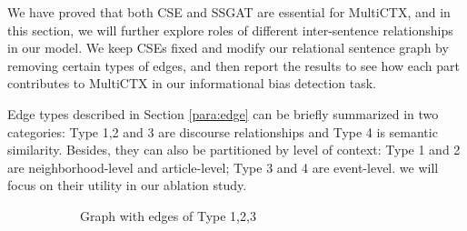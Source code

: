 \documentclass[letterpaper]{article} %
\begin{document}
We have proved that both CSE and SSGAT are essential for MultiCTX, and in this section, we will further explore roles of different inter-sentence relationships in our model. We keep CSEs fixed and modify our relational sentence graph by removing certain types of edges, and then report the results to see how each part contributes to MultiCTX in our informational bias detection task.

Edge types described in Section \ref{para:edge} can be briefly summarized in two categories: Type 1,2 and 3 are discourse relationships and Type 4 is semantic similarity. Besides, they can also be partitioned by level of context: Type 1 and 2 are neighborhood-level and article-level; Type 3 and 4 are event-level. we will focus on their utility in our ablation study. 

\begin{figure}[!htbp]\centering
  \begin{subfigure}[t]{.15\linewidth}
    \caption{\scriptsize Graph with edges of Type 1,2,3}
    \label{subfig:ab123}
  \end{subfigure}
  \begin{subfigure}[t]{.15\linewidth}

\end{subfigure}
\end{figure}
\end{document}
